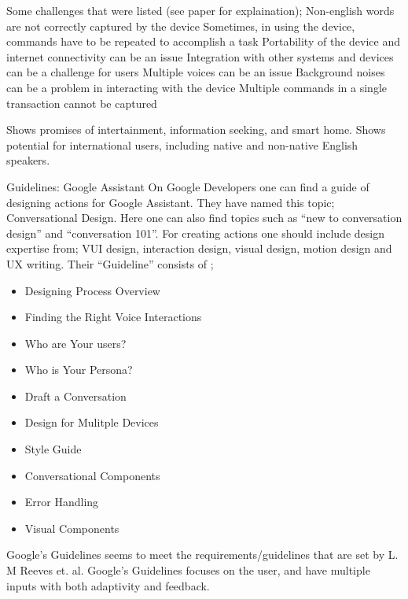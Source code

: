 Some challenges that were listed (see paper for explaination);
Non-english words are not correctly captured by the device
Sometimes, in using the device, commands have to be repeated to accomplish a task 
Portability of the device and internet connectivity can be an issue
Integration with other systems and devices can be a challenge for users 
Multiple voices can be an issue 
Background noises can be a problem in interacting with the device 
Multiple commands in a single transaction cannot be captured

Shows promises of intertainment, information seeking, and smart home. 
Shows potential for international users, including native and non-native English speakers.
\cite{pyae.a}


Guidelines: Google Assistant
On Google Developers \cite{GoogleDevelopers} one can find a guide of  designing actions for Google Assistant. They have named this topic; Conversational Design. Here one can also find topics such as “new to conversation design” and “conversation 101”. 
For creating actions one should include design expertise from; VUI design, interaction design, visual design, motion design and UX writing. 
Their “Guideline” consists of \cite{GoogleDevelopers}; 
\begin{itemize}
    \item Designing Process Overview
    \item Finding the Right Voice Interactions
    \item Who are Your users? 
    \item Who is Your Persona?
    \item Draft a Conversation 
    \item Design for Mulitple Devices
    \item Style Guide
    \item Conversational Components 
    \item Error Handling
    \item Visual Components
\end{itemize}
Google’s Guidelines seems to meet the requirements/guidelines that are set by L. M Reeves et. al. \cite{reeves.lm} Google's Guidelines focuses on the user, and have multiple inputs with both adaptivity and feedback. 


